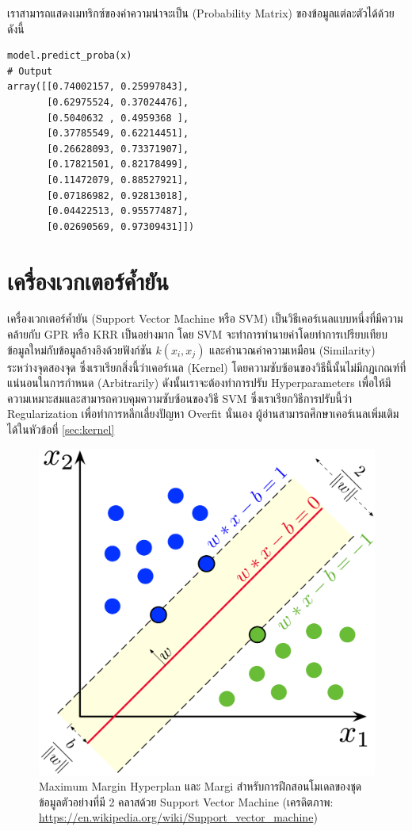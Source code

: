เราสามารถแสดงเมทริกซ์ของค่าความน่าจะเป็น (Probability Matrix) ของข้อมูลแต่ละตัวได้ด้วย ดังนี้

\begin{lstlisting}[style=MyPython]
model.predict_proba(x)
# Output
array([[0.74002157, 0.25997843],
       [0.62975524, 0.37024476],
       [0.5040632 , 0.4959368 ],
       [0.37785549, 0.62214451],
       [0.26628093, 0.73371907],
       [0.17821501, 0.82178499],
       [0.11472079, 0.88527921],
       [0.07186982, 0.92813018],
       [0.04422513, 0.95577487],
       [0.02690569, 0.97309431]])
\end{lstlisting}

\section{เครื่องเวกเตอร์ค้ำยัน}
\label{sec:svm}

เครื่องเวกเตอร์ค้ำยัน (Support Vector Machine หรือ SVM) เป็นวิธีเคอร์เนลแบบหนึ่งที่มีความคล้ายกับ GPR หรือ KRR เป็นอย่างมาก โดย SVM
จะทำการทำนายค่าโดยทำการเปรียบเทียบข้อมูลใหม่กับข้อมูลอ้างอิงด้วยฟังก์ชัน $k(x_{i},x_{j})$ และคำนวณค่าความเหมือน (Similarity)
ระหว่างจุดสองจุด ซึ่งเราเรียกสิ่งนี้ว่าเคอร์เนล (Kernel) โดยความซับซ้อนของวิธีนี้นั้นไม่มีกฎเกณฑ์ที่แน่นอนในการกำหนด (Arbitrarily)
ดังนั้นเราจะต้องทำการปรับ Hyperparameters เพื่อให้มีความเหมาะสมและสามารถควบคุมความซับซ้อนของวิธี SVM ซึ่งเราเรียกวิธีการปรับนี้ว่า
Regularization เพื่อทำการหลีกเลี่ยงปัญหา Overfit นั่นเอง ผู้อ่านสามารถศึกษาเคอร์เนลเพิ่มเติมได้ในหัวข้อที่ \ref{sec:kernel}

\begin{figure}[H]
    \centering
    \includegraphics[width=0.65\linewidth]{fig/svm.png}
    \caption{Maximum Margin Hyperplan และ Margi สำหรับการฝึกสอนโมเดลของชุดข้อมูลตัวอย่างที่มี 2 คลาสด้วย Support Vector
        Machine (เครดิตภาพ: \url{https://en.wikipedia.org/wiki/Support_vector_machine})}
    \label{fig:svm_margin}
\end{figure}

